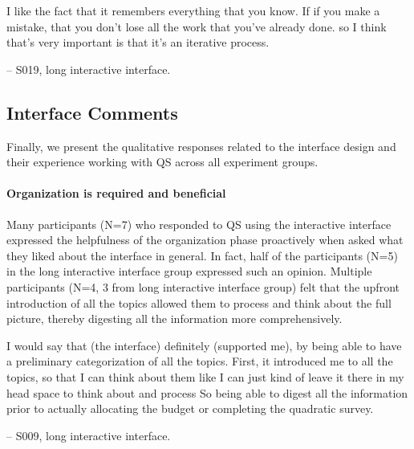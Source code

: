 \begin{displayquote}
I like the fact that it remembers everything that you know. If if you make a mistake, that you don't lose all the work that you've already done. so I think that's very important is that it's an iterative process.

\noindent \hfill -- S019, long interactive interface.
\end{displayquote}

\subsection{Interface Comments}
Finally, we present the qualitative responses related to the interface design and their experience working with QS across all experiment groups.

\paragraph{Organization is required and beneficial}
Many participants (N=7) who responded to QS using the interactive interface expressed the helpfulness of the organization phase proactively when asked what they liked about the interface in general. In fact, half of the participants (N=5) in the long interactive interface group expressed such an opinion. Multiple participants (N=4, 3 from long interactive interface group) felt that the upfront introduction of all the topics allowed them to process and think about the full picture, thereby digesting all the information more comprehensively. 

\begin{displayquote}
I would say that (the interface) definitely (supported me), by being able to have a preliminary categorization of all the topics. First, it introduced me to all the topics, so that I can think about them like I can just kind of leave it there in my head space to think about and process \bracketellipsis So being able to digest all the information prior to actually allocating the budget or completing the quadratic survey.

\noindent \hfill -- S009, long interactive interface.
\end{displayquote}


